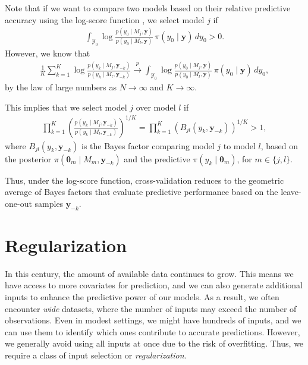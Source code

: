 Note that if we want to compare two models based on their relative predictive accuracy using the log-score function \cite{martin2022optimal}, we select model \( j \) if
\begin{align*}
	\int_{\mathcal{Y}_0} \log\frac{p(y_0 \mid M_j, \mathbf{y})}{p(y_0 \mid M_l, \mathbf{y})} \, \pi(y_0 \mid \mathbf{y}) \, dy_0 > 0.
\end{align*}
However, we know that
\begin{align*}
	\frac{1}{K}\sum_{k=1}^K\log\frac{p(y_k \mid M_j, \mathbf{y}_{-k})}{p(y_k \mid M_l, \mathbf{y}_{-k})} 
	\stackrel{p}{\rightarrow} \int_{\mathcal{Y}_0} \log\frac{p(y_0 \mid M_j, \mathbf{y})}{p(y_0 \mid M_l, \mathbf{y})} \, \pi(y_0 \mid \mathbf{y}) \, dy_0,
\end{align*}
by the law of large numbers as \( N \to \infty \) and \( K \to \infty \).

This implies that we select model \( j \) over model \( l \) if
\begin{align*}
	\prod_{k=1}^K \left( \frac{p(y_k \mid M_j, \mathbf{y}_{-k})}{p(y_k \mid M_l, \mathbf{y}_{-k})} \right)^{1/K} 
	= \prod_{k=1}^K \left( B_{jl}(y_k, \mathbf{y}_{-k}) \right)^{1/K} > 1,
\end{align*}
where \( B_{jl}(y_k, \mathbf{y}_{-k}) \) is the Bayes factor comparing model \( j \) to model \( l \), based on the posterior \( \pi(\boldsymbol{\theta}_m \mid M_m, \mathbf{y}_{-k}) \) and the predictive \( \pi(y_k \mid \boldsymbol{\theta}_m) \), for \( m \in \{j, l\} \).

Thus, under the log-score function, cross-validation reduces to the geometric average of Bayes factors that evaluate predictive performance based on the leave-one-out samples \( \mathbf{y}_{-k} \).

\section{Regularization}\label{sec13_2}

In this century, the amount of available data continues to grow. This means we have access to more covariates for prediction, and we can also generate additional inputs to enhance the predictive power of our models. As a result, we often encounter \textit{wide} datasets, where the number of inputs may exceed the number of observations. Even in modest settings, we might have hundreds of inputs, and we can use them to identify which ones contribute to accurate predictions. However, we generally avoid using all inputs at once due to the risk of overfitting. Thus, we require a class of input selection or \textit{regularization}.

